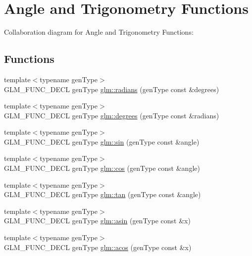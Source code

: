 \hypertarget{group__core__func__trigonometric}{
\section{Angle and Trigonometry Functions}
\label{group__core__func__trigonometric}
}


Collaboration diagram for Angle and Trigonometry Functions:\subsection*{Functions}
\begin{CompactItemize}
\item 
{\footnotesize template$<$typename genType$>$ }\\GLM\_\-FUNC\_\-DECL genType \hyperlink{group__core__func__trigonometric_g87953103f3ac701b8440a7d904fa2e4d}{glm::radians} (genType const \&degrees)
\item 
{\footnotesize template$<$typename genType$>$ }\\GLM\_\-FUNC\_\-DECL genType \hyperlink{group__core__func__trigonometric_gcb63bdf23d5e084a5b6a2ed0ae395e64}{glm::degrees} (genType const \&radians)
\item 
{\footnotesize template$<$typename genType$>$ }\\GLM\_\-FUNC\_\-DECL genType \hyperlink{group__core__func__trigonometric_gd4d4eda735d915be9af695fe2b4cded2}{glm::sin} (genType const \&angle)
\item 
{\footnotesize template$<$typename genType$>$ }\\GLM\_\-FUNC\_\-DECL genType \hyperlink{group__core__func__trigonometric_gfef15df90786cd24fe786cc0ff2cbc98}{glm::cos} (genType const \&angle)
\item 
{\footnotesize template$<$typename genType$>$ }\\GLM\_\-FUNC\_\-DECL genType \hyperlink{group__core__func__trigonometric_g93a81f04757351ba92d924e237cbeb61}{glm::tan} (genType const \&angle)
\item 
{\footnotesize template$<$typename genType$>$ }\\GLM\_\-FUNC\_\-DECL genType \hyperlink{group__core__func__trigonometric_gb87756fced3e8d3f58b24b65c8166b77}{glm::asin} (genType const \&x)
\item 
{\footnotesize template$<$typename genType$>$ }\\GLM\_\-FUNC\_\-DECL genType \hyperlink{group__core__func__trigonometric_gd945cb7263cb202d93ea76aa5d419078}{glm::acos} (genType const \&x)

\end{CompactItemize}
